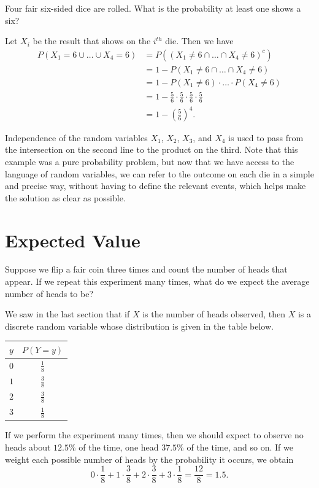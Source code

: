 \begin{example}
Four fair six-sided dice are rolled. What is the probability at least one shows a six?

Let $X_i$ be the result that shows on the $i^{th}$ die. Then we have
$$\begin{aligned}
P(X_1 = 6 \cup \dots \cup X_4 = 6) &= P((X_1 \neq 6 \cap \dots \cap X_4 \neq 6)^c) \\
&= 1 - P(X_1 \neq 6 \cap \dots \cap X_4 \neq 6) \\
&= 1 - P(X_1 \neq 6) \cdot \dots \cdot P(X_4 \neq 6) \\
&= 1 - \textstyle\frac{5}{6} \cdot \frac{5}{6} \cdot \frac{5}{6} \cdot \frac{5}{6} \\
&= 1 - (\textstyle\frac{5}{6})^4.
\end{aligned}$$
\end{example}

Independence of the random variables $X_1$, $X_2$, $X_3$, and $X_4$ is used to pass from the intersection on the second line to the product on the third. Note that this example was a pure probability problem, but now that we have access to the language of random variables, we can refer to the outcome on each die in a simple and precise way, without having to define the relevant events, which helps make the solution as clear as possible. 

\section{Expected Value}

Suppose we flip a fair coin three times and count the number of heads that appear. If we repeat this experiment many times, what do we expect the average number of heads to be?

We saw in the last section that if $X$ is the number of heads observed, then $X$ is a discrete random variable whose distribution is given in the table below.
\renewcommand*{\arraystretch}{1.35}
\begin{center}
\begin{tabular}{c|c}
$y$ & $P(Y = y)$ \\
\hline
$0$ & $\frac{1}{8}$ \\
$1$ & $\frac{3}{8}$ \\
$2$ & $\frac{3}{8}$ \\
$3$ & $\frac{1}{8}$ \\
\end{tabular}
\end{center}
\renewcommand*{\arraystretch}{1}
If we perform the experiment many times, then we should expect to observe no heads about $12.5\%$ of the time, one head $37.5\%$ of the time, and so on. If we weight each possible number of heads by the probability it occurs, we obtain
$$0 \cdot \frac{1}{8} + 1 \cdot \frac{3}{8} + 2 \cdot \frac{3}{8} + 3 \cdot \frac{1}{8} = \frac{12}{8} = 1.5.$$

